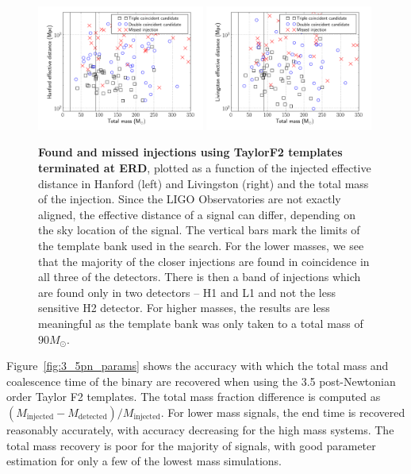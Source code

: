 \begin{figure}
\begin{center}
  \includegraphics[width=0.49\textwidth]{figures/ninja1/spa_erd_3_5pn_found_missed_mchirp}
  \includegraphics[width=0.49\textwidth]{figures/ninja1/spa_erd_3_5pn_found_missed_mchirp_l}
\end{center}
\caption{\textbf{Found and missed injections using TaylorF2 templates terminated at ERD}, plotted as a function
of the injected effective distance in Hanford (left) and Livingston (right) and the total mass of the injection. Since the LIGO Observatories are not exactly aligned, the effective distance of a signal can differ, depending on the sky location of the signal.
The vertical bars mark the limits of the template bank used in the search.  For
the lower masses, we see that the majority of the closer injections 
are found in coincidence in all three of
the detectors.  There is then a band of injections which are found only
in two detectors -- H1 and L1 and not the less sensitive H2 detector.
For higher masses, the results are less meaningful as the template bank
was only taken to a total mass of $90 M_{\odot}$.}
\label{fig:3_5pn_found_missed}
\end{figure}

Figure~\ref{fig:3_5pn_params} shows the accuracy with which the total mass and
coalescence time of the binary are recovered when using the 3.5 post-Newtonian
order Taylor F2 templates. The total mass fraction difference is computed as
$(M_\mathrm{injected} - M_\mathrm{detected})/ M_\mathrm{injected}$. For lower
mass signals, the end time is recovered reasonably accurately, with accuracy
decreasing for the high mass systems. The total mass recovery is poor for the
majority of signals, with good parameter estimation for only a few of the
lowest mass simulations.


